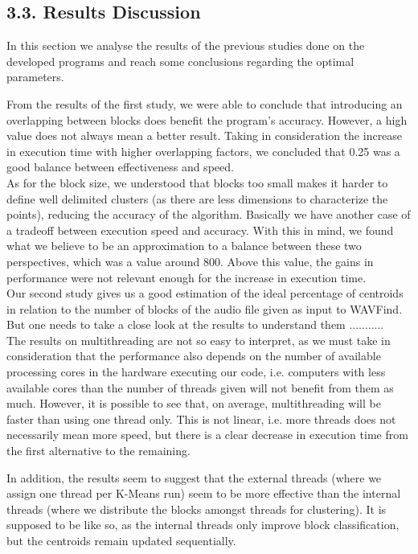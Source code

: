 \documentclass[12pt]{article}
\begin{document}
\subsection*{3.3. Results Discussion}

In this section we analyse the results of the previous studies done on the 
developed programs and reach some conclusions regarding the optimal parameters.

From the results of the first study, we were able to conclude that introducing 
an overlapping between blocks does benefit the program's accuracy.
However, a high value does not always mean a better result.
Taking in consideration the increase in execution time with higher overlapping 
factors, we concluded that 0.25 was a good balance between effectiveness and speed. \\

As for the block size, we understood that blocks too small makes it harder to 
define well delimited clusters (as there are less dimensions to characterize the
points), reducing the accuracy of the algorithm.
Basically we have another case of a tradeoff between execution speed and accuracy.
With this in mind, we found what we believe to be an approximation to a balance
between these two perspectives, which was a value around 800. 
Above this value, the gains in performance were not relevant enough for the 
increase in execution time. \\

Our second study gives us a good estimation of the ideal percentage of centroids
in relation to the number of blocks of the audio file given as input to WAVFind.
But one needs to take a close look at the results to understand them ........... \\

The results on multithreading are not so easy to interpret, as we must take in 
consideration that the performance also depends on the number of available 
processing cores in the hardware executing our code, i.e. computers with less
available cores than the number of threads given will not benefit from them as much.
However, it is possible to see that, on average, multithreading will be faster
than using one thread only.
This is not linear, i.e. more threads does not necessarily mean more speed, but
there is a clear decrease in execution time from the first alternative to the 
remaining.

In addition, the results seem to suggest that the external threads (where we 
assign one thread per K-Means run) seem to be more effective than the internal
threads (where we distribute the blocks amongst threads for clustering).
It is supposed to be like so, as the internal threads only improve block 
classification, but the centroids remain updated sequentially.
\end{document}
